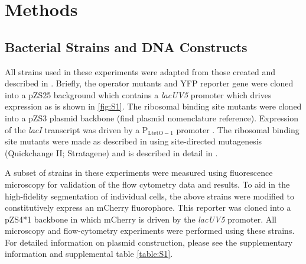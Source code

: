 \pagebreak
\section*{Methods }

\subsection*{Bacterial Strains and DNA Constructs}
All strains used in these experiments were adapted from those created and
described in \citep{Garcia2011}. Briefly, the operator mutants and YFP reporter
gene were cloned into a pZS25 background which contains a \textit{lacUV5}
promoter which drives expression as is shown in \ref{fig:S1}. The ribosomal
binding site mutants were cloned into a pZS3 plasmid backbone (find plasmid nomenclature reference). Expression of
the \textit{lacI} transcript was driven by a P$_\mathrm{LtetO-1}$ promoter
\cite{Lutz1997}. The ribosomal binding site mutants were made as described in
\citep{Salis2009} using site-directed mutagenesis (Quickchange II; Stratagene)
and is described in detail in \citep{Garcia2011}.

A subset of strains in these experiments were measured using fluorescence
microscopy for validation of the flow cytometry data and results. To aid in the
high-fidelity segmentation of individual cells, the above strains were
modified to constitutively express an mCherry fluorophore. This reporter was
cloned into a pZS4*1 backbone in which mCherry is driven by the \textit{lacUV5} promoter.
All microscopy and flow-cytometry experiments were performed using these
strains. For detailed information on plasmid construction, please see the
supplementary information and supplemental table \ref{table:S1}.


